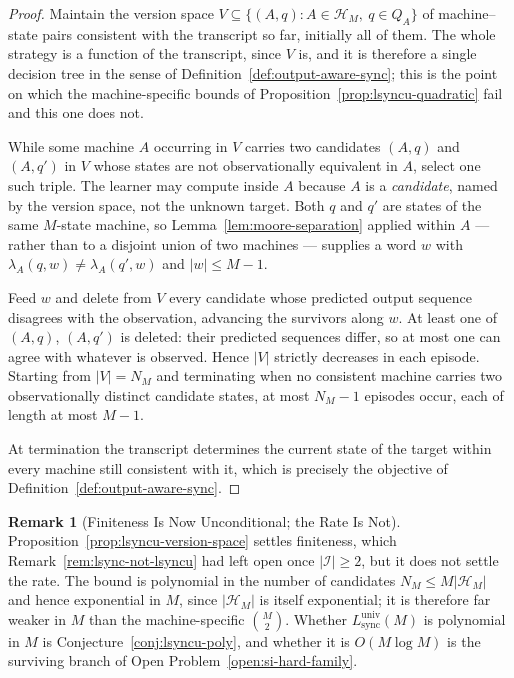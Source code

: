 \documentclass[12pt]{article}
\theoremstyle{definition}
\newtheorem{remark}[theorem]{Remark}
\newcommand{\Lsyncu}{L_{\mathrm{sync}}^{\mathrm{univ}}}
\begin{document}
\begin{proof}
Maintain the version space $V\subseteq\{(A,q):A\in\mathcal H_M,\ q\in Q_A\}$ of
machine--state pairs consistent with the transcript so far, initially all of
them.  The whole strategy is a function of the transcript, since $V$ is, and it
is therefore a single decision tree in the sense of
Definition~\ref{def:output-aware-sync}; this is the point on which the
machine-specific bounds of Proposition~\ref{prop:lsyncu-quadratic} fail and
this one does not.

While some machine $A$ occurring in $V$ carries two candidates $(A,q)$ and
$(A,q')$ in $V$ whose states are not observationally equivalent in $A$, select
one such triple.  The learner may compute inside $A$ because $A$ is a
\emph{candidate}, named by the version space, not the unknown target.  Both $q$
and $q'$ are states of the same $M$-state machine, so
Lemma~\ref{lem:moore-separation} applied within $A$ --- rather than to a
disjoint union of two machines --- supplies a word $w$ with
$\lambda_A(q,w)\ne\lambda_A(q',w)$ and $|w|\le M-1$.

Feed $w$ and delete from $V$ every candidate whose predicted output sequence
disagrees with the observation, advancing the survivors along $w$.  At least
one of $(A,q)$, $(A,q')$ is deleted: their predicted sequences differ, so at
most one can agree with whatever is observed.  Hence $|V|$ strictly decreases
in each episode.  Starting from $|V|=N_M$ and terminating when no consistent
machine carries two observationally distinct candidate states, at most
$N_M-1$ episodes occur, each of length at most $M-1$.

At termination the transcript determines the current state of the target within
every machine still consistent with it, which is precisely the objective of
Definition~\ref{def:output-aware-sync}.
\end{proof}

\begin{remark}[Finiteness Is Now Unconditional; the Rate Is Not]
\label{rem:lsyncu-finite-not-rate}
Proposition~\ref{prop:lsyncu-version-space} settles finiteness, which
Remark~\ref{rem:lsync-not-lsyncu} had left open once $|\mathcal I|\ge2$, but it
does not settle the rate.  The bound is polynomial in the number of candidates
$N_M\le M|\mathcal H_M|$ and hence exponential in $M$, since
$|\mathcal H_M|$ is itself exponential; it is therefore far weaker in $M$ than
the machine-specific $\binom{M}{2}$.  Whether $\Lsyncu(M)$ is polynomial in $M$
is Conjecture~\ref{conj:lsyncu-poly}, and whether it is $O(M\log M)$ is the
surviving branch of Open Problem~\ref{open:si-hard-family}.
\end{remark}
\end{document}
